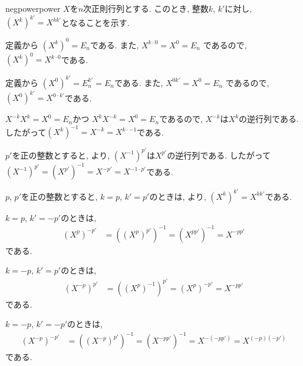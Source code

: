   
\begin{proofof*}{negpower}{power}
  $X$を$n$次正則行列とする.
  このとき, 整数$k$, $k'$に対し, $(X^{k})^{k'}=X^{kk'}$となることを示す.

  定義から
  $(X^{k})^{0}=E_n$である.
  また,
  $X^{k\cdot 0}=X^0=E_n$
  であるので, $(X^{k})^{0}=X^{k\cdot0}$である.

  定義から
  $(X^{0})^{k'}=E_n^{k'}=E_n$である.
  また,
  $X^{0k'}=X^0=E_n$
  であるので, $(X^{0})^{k'}=X^{0\cdot k'}$である.

  
  $X^{-k}X^{k}=X^0=E_n$かつ
  $X^{k}X^{-k}=X^0=E_n$であるので,
  $X^{-k}$は$X^k$の逆行列である.
  したがって$(X^{k})^{-1}=X^{-k}=X^{k\cdot -1}$である.

  $p'$を正の整数とすると,
  より,
  $(X^{-1})^{p'}$は$X^{p'}$の逆行列である.
  したがって$(X^{-1})^{p'}=(X^{p'})^{-1}=X^{-p'}=X^{-1\cdot p'}$である.

  $p$, $p'$を正の整数とすると,
  $k=p$, $k'=p'$のときは,
  より,
  $(X^{k})^{k'}=X^{kk'}$である.

  $k=p$, $k'=-p'$のときは,
  \begin{align*}
    (X^{p})^{-p'}&=((X^{p})^{p'})^{-1}=(X^{pp'})^{-1}=X^{-pp'}
  \end{align*}
  である.

  $k=-p$, $k'=p'$のときは,
  \begin{align*}
    (X^{-p})^{p'}&=((X^{p})^{-1})^{p'}=(X^{p})^{-p'}=X^{-pp'}
  \end{align*}
  である.

  $k=-p$, $k'=-p'$のときは,
  \begin{align*}
    (X^{-p})^{-p'}&=((X^{-p})^{p'})^{-1}=(X^{-pp'})^{-1}=X^{-(-pp')}=X^{(-p)(-p')}
  \end{align*}
  である.

\end{proofof*}


